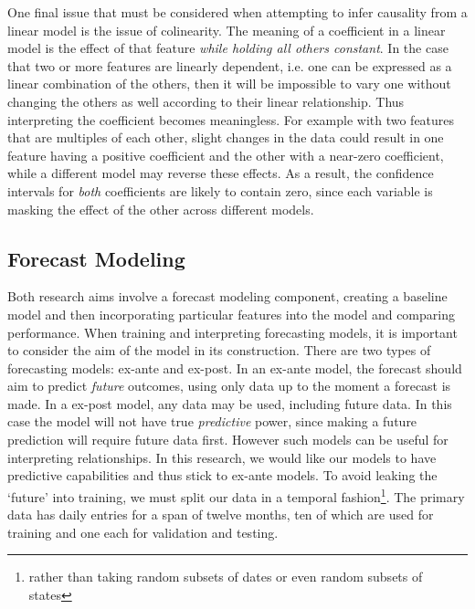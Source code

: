 \documentclass[11pt]{article}
\newcommand{\todo}[1]{\color{red}{\colorbox{pink}{\textbf{#1}}}\color{black}}
\begin{document}
One final issue that must be considered when attempting to infer causality from a linear model is the issue of colinearity. The meaning of a coefficient in a linear model is the effect of that feature \textit{while holding all others constant}. In the case that two or more features are linearly dependent, i.e. one can be expressed as a linear combination of the others, then it will be impossible to vary one without changing the others as well according to their linear relationship. Thus interpreting the coefficient becomes meaningless. For example with two features that are multiples of each other, slight changes in the data could result in one feature having a positive coefficient and the other with a near-zero coefficient, while a different model may reverse these effects. As a result, the confidence intervals for \textit{both} coefficients are likely to contain zero, since each variable is masking the effect of the other across different models. 










\subsection{Forecast Modeling}


Both research aims involve a forecast modeling component, creating a baseline model and then incorporating particular features into the model and comparing performance. When training and interpreting forecasting models, it is important to consider the aim of the model in its construction. There are two types of forecasting models: ex-ante and ex-post. In an ex-ante model, the forecast should aim to predict \textit{future} outcomes, using only data up to the moment a forecast is made. In a ex-post model, any data may be used, including future data. In this case the model will not have true \textit{predictive} power, since making a future prediction will require future data first. However such models can be useful for interpreting relationships. 
In this research, we would like our models to have predictive capabilities and thus stick to ex-ante models. 
%
To avoid leaking the `future' into training, we must split our data in a temporal fashion\footnote{rather than taking random subsets of dates or even random subsets of states}. The primary data has daily entries for a span of twelve months, ten of which are used for training and one each for validation and testing. 
\end{document}
